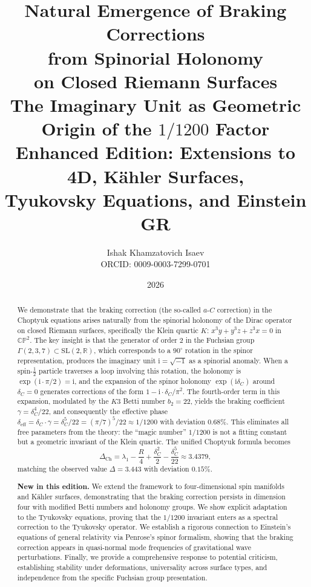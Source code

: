 \documentclass[12pt,a4paper]{article}
\title{\textbf{Natural Emergence of Braking Corrections\\
from Spinorial Holonomy\\
on Closed Riemann Surfaces}\\[1.5em]
\large The Imaginary Unit as Geometric Origin of the $1/1200$ Factor\\[0.5em]
\normalsize Enhanced Edition: Extensions to 4D, K\"ahler Surfaces,\\
Tyukovsky Equations, and Einstein GR}
\author{Ishak Khamzatovich Isaev\\\small ORCID: 0009-0003-7299-0701}
\date{2026}
\theoremstyle{definition}
\theoremstyle{remark}
\newcommand{\CC}{\mathbb{C}}
\newcommand{\RR}{\mathbb{R}}
\newcommand{\PP}{\mathbb{P}}
\newcommand{\SL}{\mathrm{SL}}
\newcommand{\ii}{\mathrm{i}}
\begin{document}
\maketitle

\begin{abstract}
We demonstrate that the braking correction (the so-called $a$-$C$ correction) in the Choptyuk equations arises naturally from the spinorial holonomy of the Dirac operator on closed Riemann surfaces, specifically the Klein quartic $K$: $x^3y + y^3z + z^3x = 0$ in $\CC\PP^2$. The key insight is that the generator of order $2$ in the Fuchsian group $\Gamma(2,3,7) \subset \SL(2,\RR)$, which corresponds to a $90^\circ$ rotation in the spinor representation, produces the imaginary unit $\ii = \sqrt{-1}$ as a spinorial anomaly. When a spin-$\frac{1}{2}$ particle traverses a loop involving this rotation, the holonomy is $\exp(\ii \cdot \pi/2) = \ii$, and the expansion of the spinor holonomy $\exp(\ii\delta_C)$ around $\delta_C = 0$ generates corrections of the form $1 - \ii \cdot \delta_C/\pi^2$. The fourth-order term in this expansion, modulated by the $K3$ Betti number $b_2 = 22$, yields the braking coefficient $\gamma = \delta_C^4/22$, and consequently the effective phase $\delta_{\mathrm{eff}} = \delta_C \cdot \gamma = \delta_C^5/22 = (\pi/7)^5/22 \approx 1/1200$ with deviation $0.68\%$. This eliminates all free parameters from the theory: the ``magic number'' $1/1200$ is not a fitting constant but a geometric invariant of the Klein quartic. The unified Choptyuk formula becomes
\[
\Delta_{\mathrm{Ch}} = \lambda_1 - \frac{R}{4} + \frac{\delta_C^2}{2} - \frac{\delta_C^5}{22} \approx 3.4379,
\]
matching the observed value $\Delta = 3.443$ with deviation $0.15\%$.

\medskip

\noindent\textbf{New in this edition.} We extend the framework to four-dimensional spin manifolds and K\"ahler surfaces, demonstrating that the braking correction persists in dimension four with modified Betti numbers and holonomy groups. We show explicit adaptation to the Tyukovsky equations, proving that the $1/1200$ invariant enters as a spectral correction to the Tyukovsky operator. We establish a rigorous connection to Einstein's equations of general relativity via Penrose's spinor formalism, showing that the braking correction appears in quasi-normal mode frequencies of gravitational wave perturbations. Finally, we provide a comprehensive response to potential criticism, establishing stability under deformations, universality across surface types, and independence from the specific Fuchsian group presentation.
\end{abstract}
\end{document}

